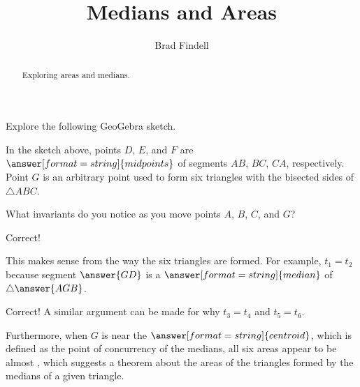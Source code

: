 \documentclass[handout,nooutcomes]{ximera}
\title{Medians and Areas}
\author{Brad Findell}
\begin{document}
\begin{abstract}
Exploring areas and medians. 
\end{abstract}
\maketitle




\begin{problem}
Explore the following GeoGebra sketch.  
\begin{center}  
\end{center}
In the sketch above, points $D$, $E$, and $F$ are $\answer[format=string]{midpoints}$ of segments $AB$, $BC$, $CA$, respectively.  Point $G$ is an arbitrary point used to form six triangles with the bisected sides of $\triangle ABC$.  

What invariants do you notice as you move points $A$, $B$, $C$, and $G$?  

\begin{multipleChoice}
\end{multipleChoice}

\begin{problem}
Correct! 

This makes sense from the way the six triangles are formed.  For example, $t_1 = t_2$ because segment $\answer{GD}$ is a $\answer[format=string]{median}$ of $\triangle \answer{AGB}$.
\begin{problem}
Correct!  A similar argument can be made for why $t_3 = t_4$ and $t_5 = t_6$.

Furthermore, when $G$ is near the $\answer[format=string]{centroid}$, which is defined as the point of concurrency of the medians, all six areas appear to be almost 
, which suggests a theorem about the areas of the triangles formed by the medians of a given triangle. 

\end{problem}
\end{problem}
\end{problem}
\end{document}
